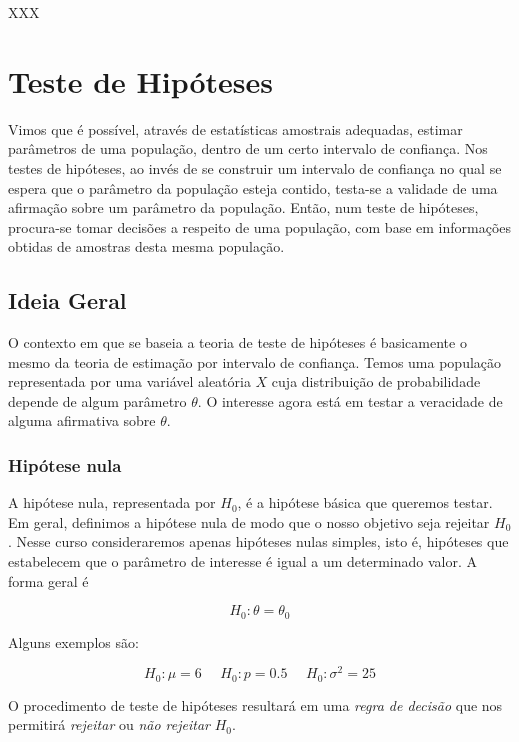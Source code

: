 \documentclass[
]{book}
\begin{document}
XXX

\hypertarget{teste-de-hipuxf3teses}{%
\chapter{Teste de Hipóteses}\label{teste-de-hipuxf3teses}}

Vimos que é possível, através de estatísticas amostrais adequadas, estimar parâmetros de uma população, dentro de um certo intervalo de confiança. Nos testes de hipóteses, ao invés de se construir um intervalo de confiança no qual se espera que o parâmetro da população esteja contido, testa-se a validade de uma afirmação sobre um parâmetro da população. Então, num teste de hipóteses, procura-se tomar decisões a respeito de uma população, com base em informações obtidas de amostras desta mesma população.

\hypertarget{ideia-geral-1}{%
\section{Ideia Geral}\label{ideia-geral-1}}

O contexto em que se baseia a teoria de teste de hipóteses é basicamente o mesmo da teoria de estimação por intervalo de confiança. Temos uma população representada por uma variável aleatória \(X\) cuja distribuição de probabilidade depende de algum parâmetro \(\theta\). O interesse agora está em testar a veracidade de alguma afirmativa sobre \(\theta\).

\hypertarget{hipuxf3tese-nula}{%
\subsection{Hipótese nula}\label{hipuxf3tese-nula}}

A hipótese nula, representada por \(H_0\), é a hipótese básica que queremos testar. Em geral, definimos a hipótese nula de modo que o nosso objetivo seja rejeitar \(H_0\). Nesse curso consideraremos apenas hipóteses nulas simples, isto é, hipóteses que estabelecem que o parâmetro de interesse é igual a um determinado valor. A forma geral é

\[H_0: \theta=\theta_0\]

Alguns exemplos são:

\[H_0: \mu=6 ~~~~~~ H_0: p=0.5 ~~~~~~ H_0: \sigma^2=25\]

O procedimento de teste de hipóteses resultará em uma \emph{regra de decisão} que nos permitirá \emph{rejeitar} ou \emph{não rejeitar} \(H_0\).
\end{document}

